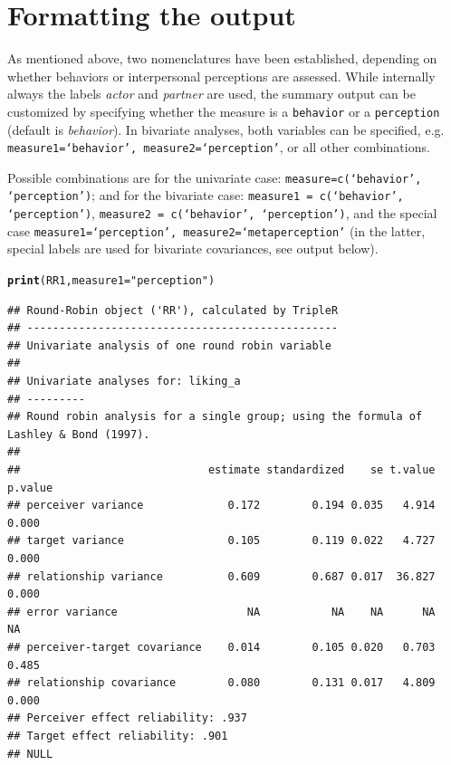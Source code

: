 \documentclass[a4paper]{article}\usepackage[]{graphicx}\usepackage[]{color}
\makeatletter
\newcommand{\hlstr}[1]{\textcolor[rgb]{0.192,0.494,0.8}{#1}}%
\newcommand{\hlstd}[1]{\textcolor[rgb]{0.345,0.345,0.345}{#1}}%
\newcommand{\hlkwc}[1]{\textcolor[rgb]{0.333,0.667,0.333}{#1}}%
\newcommand{\hlkwd}[1]{\textcolor[rgb]{0.737,0.353,0.396}{\textbf{#1}}}%
\newenvironment{kframe}{%
 \def\at@end@of@kframe{}%
 \ifinner\ifhmode%
  \def\at@end@of@kframe{\end{minipage}}%
  \begin{minipage}{\columnwidth}%
 \fi\fi%
 \def\FrameCommand##1{\hskip\@totalleftmargin \hskip-\fboxsep
 \colorbox{shadecolor}{##1}\hskip-\fboxsep
     \hskip-\linewidth \hskip-\@totalleftmargin \hskip\columnwidth}%
 \MakeFramed {\advance\hsize-\width
   \@totalleftmargin\z@ \linewidth\hsize
   \@setminipage}}%
 {\par\unskip\endMakeFramed%
 \at@end@of@kframe}
\newenvironment{knitrout}{}{} %
\makeatother
\begin{document}






\section{Formatting the output} 
As mentioned above, two nomenclatures have been established, depending on whether behaviors or interpersonal perceptions are assessed. While internally always the labels \emph{actor} and \emph{partner} are used, the summary output can be customized by specifying whether the measure is a \texttt{behavior} or a \texttt{perception} (default is \emph{behavior}). In bivariate analyses, both variables can be specified, e.g. \texttt{measure1=`behavior', measure2=`perception'}, or all other combinations.

Possible combinations are for the univariate case: \texttt{measure=c(`behavior', `perception')}; and for the bivariate case: \texttt{measure1 = c(`behavior', `perception')}, \texttt{measure2 = c(`behavior', `perception')}, and the special case \texttt{measure1=`perception', measure2=`metaperception'} (in the latter, special labels are used for bivariate covariances, see output below).

\begin{knitrout}\small
{}\color{fgcolor}\begin{kframe}
\begin{alltt}
\hlkwd{print}\hlstd{(RR1,} \hlkwc{measure1} \hlstd{=} \hlstr{"perception"}\hlstd{)}
\end{alltt}
\begin{verbatim}
## Round-Robin object ('RR'), calculated by TripleR
## ------------------------------------------------
## Univariate analysis of one round robin variable
## 
## Univariate analyses for: liking_a 
## ---------
## Round robin analysis for a single group; using the formula of Lashley & Bond (1997).
## 
##                             estimate standardized    se t.value p.value
## perceiver variance             0.172        0.194 0.035   4.914   0.000
## target variance                0.105        0.119 0.022   4.727   0.000
## relationship variance          0.609        0.687 0.017  36.827   0.000
## error variance                    NA           NA    NA      NA      NA
## perceiver-target covariance    0.014        0.105 0.020   0.703   0.485
## relationship covariance        0.080        0.131 0.017   4.809   0.000
## Perceiver effect reliability: .937 
## Target effect reliability: .901 
## NULL
\end{verbatim}
\end{kframe}
\end{knitrout}
\end{document}
